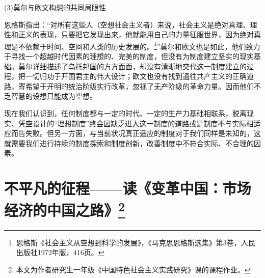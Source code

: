 \par (3)莫尔与欧文构想的共同局限性
\par 恩格斯指出：“对所有这些人（空想社会主义者）来说，社会主义是绝对真理、理性和正义的表现，只要把它发现出来，他就能用自己的力量征服世界，因为绝对真理是不依赖于时间、空间和人类的历史发展的。\footnote{恩格斯《社会主义从空想到科学的发展》，《马克思恩格斯选集》第3卷，人民出版社1972年版，416页。}”莫尔和欧文也是如此，他们致力于寻找一个超越时代因素的理想的、完美的制度，但没有为制度建立坚实的现实基础。莫尔详细描述了乌托邦国的方方面面，却没有清晰地交代这一制度建立的过程，把一切归功于开国君主的伟大设计；欧文也没有找到通往共产主义的正确道路，寄希望于开明的统治阶级实行改革，忽视了无产阶级的革命力量。因而他们不乏智慧的设想只能成为空想。
\par 现在我们认识到，任何制度都与一定的时代、一定的生产力基础相联系，脱离现实、凭空设计的“理想制度”终会因缺乏进入这一制度的道路或是制度不与实际相适应而告失败。但另一方面，与当前状况真正适应的制度对于我们同样是未知的，这就需要我们进行持续的制度探索和制度创新，改善制度中不符合实际、不合理的因素。
\par {}

\section*{不平凡的征程——读《变革中国：市场经济的中国之路》\footnote{本文为作者研究生一年级《中国特色社会主义实践研究》课的课程作业。}}

